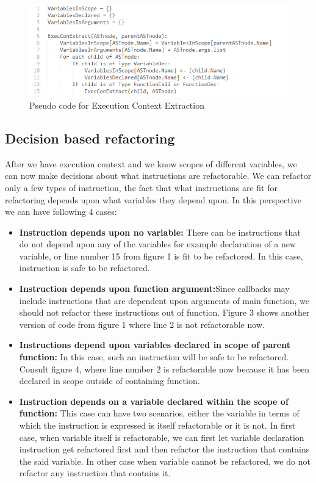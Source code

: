 \documentclass[10pt,conference]{IEEEtran}
\begin{document}
\begin{figure}[t]
	\includegraphics[scale=0.5]{code-execcon-extract.png}
	\caption{Pseudo code for Execution Context Extraction}
	\label{fig}
\end{figure}



\subsection{Decision based refactoring}


After we have execution context and we know scopes of different variables, we can now make decisions about what instructions are refactorable. We can refactor only a few types of instruction, the fact that what instructions are fit for refactoring depends upon what variables they depend upon. In this perspective we can have following 4 cases:
\begin{itemize}
	\item {\textbf{Instruction depends upon no variable:}
		There can be instructions that do not depend upon any of the variables for example declaration of a new variable, or line number 15 from figure 1 is fit to be refactored. In this case, instruction is safe to be refactored.}
	\item{\textbf{Instruction depends upon function argument:}Since callbacks may include instructions that are dependent upon arguments of main function, we should not refactor these instructions out of function. Figure 3 shows another version of code from figure 1 where line 2 is not refactorable now.}
	\item{\textbf{Instructions depend upon variables declared in scope of parent function:}
		In this case, such an instruction will be safe to be refactored. Consult figure 4, where line number 2 is refactorable now because it has been declared in scope outside of containing function.}
	\item{\textbf{Instruction depends on a variable declared within the scope of function:}
		This case can have two scenarios, either the variable in terms of which the instruction is expressed is itself refactorable or it is not. In first case, when variable itself is refactorable, we can first let variable declaration instruction get refactored first and then refactor the instruction that contains the said variable.
		In other case when variable cannot be refactored, we do not refactor any instruction that contains it.}
\end{itemize}
\end{document}

